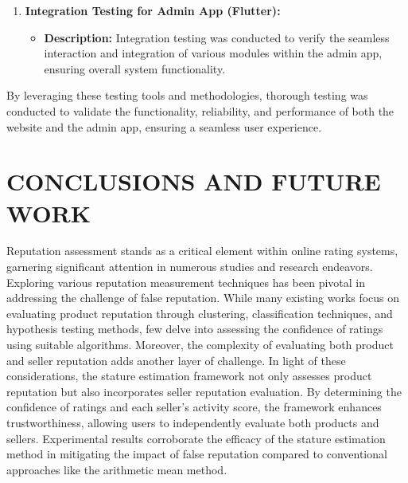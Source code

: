 \documentclass[12pt,a4paper]{report}
\begin{document}
\begin{enumerate}
    \item \textbf{Integration Testing for Admin App (Flutter):}
          \begin{itemize}
              \item \textbf{Description:} Integration testing was conducted to verify the seamless interaction and integration of various modules within the admin app, ensuring overall system functionality.
          \end{itemize}
\end{enumerate}

By leveraging these testing tools and methodologies, thorough testing was conducted to validate the functionality, reliability, and performance of both the website and the admin app, ensuring a seamless user experience.

\chapter{CONCLUSIONS AND FUTURE WORK}

Reputation assessment stands as a critical element within online rating systems, garnering significant attention in numerous studies and research endeavors. Exploring various reputation measurement techniques has been pivotal in addressing the challenge of false reputation. While many existing works focus on evaluating product reputation through clustering, classification techniques, and hypothesis testing methods, few delve into assessing the confidence of ratings using suitable algorithms. Moreover, the complexity of evaluating both product and seller reputation adds another layer of challenge. In light of these considerations, the stature estimation framework not only assesses product reputation but also incorporates seller reputation evaluation. By determining the confidence of ratings and each seller's activity score, the framework enhances trustworthiness, allowing users to independently evaluate both products and sellers. Experimental results corroborate the efficacy of the stature estimation method in mitigating the impact of false reputation compared to conventional approaches like the arithmetic mean method.
\end{document}

